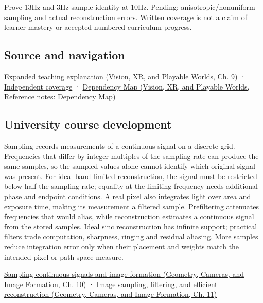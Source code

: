 Prove 13Hz and 3Hz sample identity at 10Hz. Pending: anisotropic/nonuniform sampling and actual reconstruction errors. Written coverage is not a claim of learner mastery or accepted numbered-curriculum progress.

\subsection{Source and navigation}\label{appendix-6a7869dd79a6-source-and-navigation}

\hypertarget{appendix-6a7869dd79a6-source-and-navigation}{}

\href{../07-Vision-XR-and-Playable-Worlds/main.pdf\#nameddest=04-visual-computing-ii-ch042-sampling-is-a-question-of-what-remains-distinguishable}{Expanded teaching explanation (Vision, XR, and Playable Worlds, Ch. 9)} · \hyperref[appendix-fd090d982a15-xr01---independent-seeing-and-representation-source]{Independent coverage} · \href{../07-Vision-XR-and-Playable-Worlds/main.pdf\#nameddest=appendix-4ad47bdd269a}{Dependency Map (Vision, XR, and Playable Worlds, Reference notes: Dependency Map)}

\subsection{University course development}\label{appendix-6a7869dd79a6-university-course-development}

\hypertarget{appendix-6a7869dd79a6-university-course-development}{}

Sampling records measurements of a continuous signal on a discrete grid. Frequencies that differ by integer multiples of the sampling rate can produce the same samples, so the sampled values alone cannot identify which original signal was present. For ideal band-limited reconstruction, the signal must be restricted below half the sampling rate; equality at the limiting frequency needs additional phase and endpoint conditions. A real pixel also integrates light over area and exposure time, making its measurement a filtered sample. Prefiltering attenuates frequencies that would alias, while reconstruction estimates a continuous signal from the stored samples. Ideal sinc reconstruction has infinite support; practical filters trade computation, sharpness, ringing and residual aliasing. More samples reduce integration error only when their placement and weights match the intended pixel or path-space measure.

\href{../03-Geometry-Cameras-and-Image-Formation/main.pdf\#nameddest=03-visual-computing-i-ch003-sampling-continuous-signals-and-image-formation}{Sampling continuous signals and image formation (Geometry, Cameras, and Image Formation, Ch. 10)} · \href{../03-Geometry-Cameras-and-Image-Formation/main.pdf\#nameddest=03-visual-computing-i-ch004-image-sampling-filtering-and-efficient-reconstruction}{Image sampling, filtering, and efficient reconstruction (Geometry, Cameras, and Image Formation, Ch. 11)}

